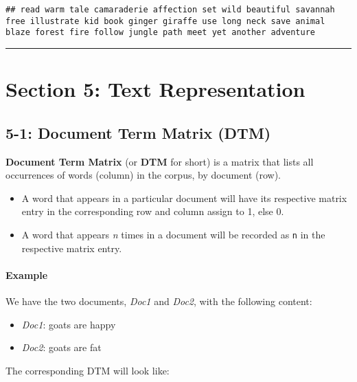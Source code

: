 \documentclass[
]{article}
\providecommand{\tightlist}{%
  \setlength{\itemsep}{0pt}\setlength{\parskip}{0pt}}
\begin{document}
\begin{verbatim}
## read warm tale camaraderie affection set wild beautiful savannah free illustrate kid book ginger giraffe use long neck save animal blaze forest fire follow jungle path meet yet another adventure
\end{verbatim}

\begin{center}\rule{0.5\linewidth}{0.5pt}\end{center}

\hypertarget{section-5-text-representation}{%
\section{Section 5: Text
Representation}\label{section-5-text-representation}}

\hypertarget{document-term-matrix-dtm}{%
\subsection{5-1: Document Term Matrix
(DTM)}\label{document-term-matrix-dtm}}

\textbf{Document Term Matrix} (or \textbf{DTM} for short) is a matrix
that lists all occurrences of words (column) in the corpus, by document
(row).

\begin{itemize}
\item
  A word that appears in a particular document will have its respective
  matrix entry in the corresponding row and column assign to 1, else 0.
\item
  A word that appears \emph{n} times in a document will be recorded as
  \texttt{n} in the respective matrix entry.
\end{itemize}

\hypertarget{example}{%
\paragraph{Example}\label{example}}

We have the two documents, \emph{Doc1} and \emph{Doc2}, with the
following content:

\begin{itemize}
\tightlist
\item
  \emph{Doc1}: goats are happy
\item
  \emph{Doc2}: goats are fat
\end{itemize}

The corresponding DTM will look like:
\end{document}
